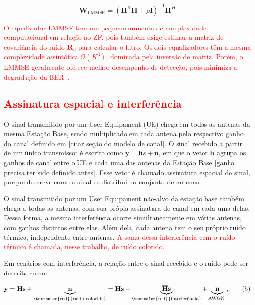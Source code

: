 \begin{equation}
\mathbf{W}_\text{LMMSE}=
\left(
\mathbf{H}^H\mathbf{H}
+
\rho\mathbf{I}
\right)^{-1}
\mathbf{H}^H
\label{eq:lmmse_awgn}
\end{equation}


\textcolor{red}{O equalizador LMMSE tem um pequeno aumento de complexidade computacional em relação ao ZF, pois também exige estimar a matriz de covariância do ruído $\mathbf{R}_n$ para calcular o filtro. Os dois equalizadores têm a mesma complexidade assintótica $\mathcal{O}(K^3)$, dominada pela inversão de matriz. Porém, o LMMSE geralmente oferece melhor desempenho de detecção, pois minimiza a degradação da BER~\cite{li-tradeofs}.}



 

\subsection{\texorpdfstring{\textcolor{red}{Assinatura espacial e interferência}}{Assinatura espacial e interferência}}

O sinal transmitido por um User Equipament (UE) chega em todas as antenas da mesma Estação Base, sendo multiplicado em cada antena pelo respectivo ganho do canal definido em [citar seção do modelo de canal]. O sinal recebido a partir de um único transmissor é escrito como $\mathbf{y}=\mathbf{h}s+\mathbf{n}$, em que o vetor $\mathbf{h}$ agrupa os ganhos de canal entre o UE e cada uma das antenas da Estação Base [ganho precisa ter sido definido antes]. Esse vetor é chamado assinatura espacial do sinal, porque descreve como o sinal se distribui no conjunto de antenas. 

O sinal transmitido por um User Equipament não-alvo da estação base também chega a todas as antenas, com sua própia assinatura de canal em cada uma delas. Dessa forma, a mesma interferência ocorre simultaneamente em várias antenas, com ganhos distintos entre elas. Além dela, cada antena tem o seu próprio ruído térmico, independente entre antenas. \textcolor{red}{A soma dessa interferência com o ruído térmico é chamada, nesse trabalho, de ruído colorido.}

Em cenários com interferência, a relação entre o sinal recebido e o ruído pode ser descrita como:

\begin{equation*}
\mathbf{y}=\mathbf{H s}+\underbrace{\mathbf{n}}_{\text{\textcolor{red}{ruído colorido}}}=\mathbf{H s}+\underbrace{\overline{\mathbf{H}} \overline{\mathbf{s}}}_{\text{\textcolor{red}{interferência}}}+\underbrace{\overline{\mathbf{n}}}_{\text {AWGN }}, \tag{5}
\end{equation*}

